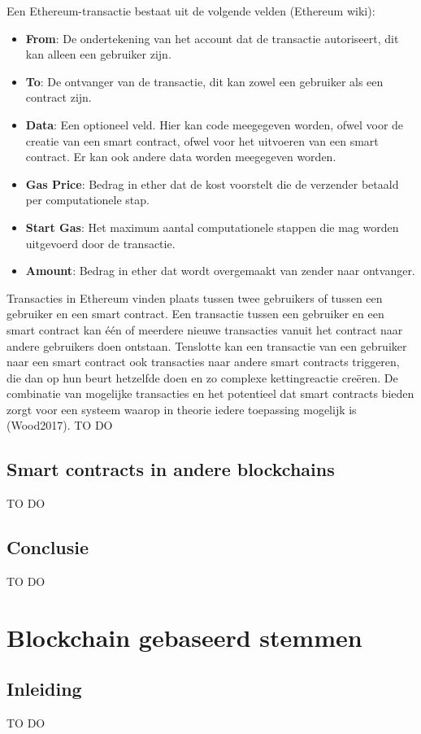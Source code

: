 		Een Ethereum-transactie bestaat uit de volgende velden (Ethereum wiki):
		\begin{itemize}
			\item \textbf{From}: De ondertekening van het account dat de transactie autoriseert, dit kan alleen een gebruiker zijn.
			\item \textbf{To}: De ontvanger van de transactie, dit kan zowel een gebruiker als een contract zijn. 
			\item \textbf{Data}: Een optioneel veld. Hier  kan code meegegeven worden, ofwel voor de creatie van een smart contract, ofwel voor het uitvoeren van een smart contract.
Er kan ook andere data worden meegegeven worden.
			\item \textbf{Gas Price}: Bedrag in ether dat de kost voorstelt die de verzender betaald per computationele stap.
			\item \textbf{Start Gas}: Het maximum aantal computationele stappen die mag worden uitgevoerd door de transactie.
			\item \textbf{Amount}: Bedrag in ether dat wordt overgemaakt van zender naar ontvanger.
		\end{itemize}	
		Transacties in Ethereum vinden plaats tussen twee gebruikers of tussen een gebruiker en een smart contract. Een transactie tussen een gebruiker en een smart contract kan één of meerdere nieuwe transacties vanuit het contract naar andere gebruikers doen ontstaan. Tenslotte kan een transactie van een gebruiker naar een smart contract ook transacties naar andere smart contracts triggeren, die dan op hun beurt hetzelfde doen en zo complexe kettingreactie creëren. De combinatie van mogelijke transacties en het potentieel dat smart contracts bieden zorgt voor een systeem waarop in theorie iedere toepassing mogelijk is (Wood2017). 
			TO DO
		
	\subsection{Smart contracts in andere blockchains}
		TO DO
	\subsection{Conclusie}
		TO DO
\section{Blockchain gebaseerd stemmen}
\label{sec:blockchain-gebaseerd-stemmen}
	\subsection*{Inleiding}
			TO DO
